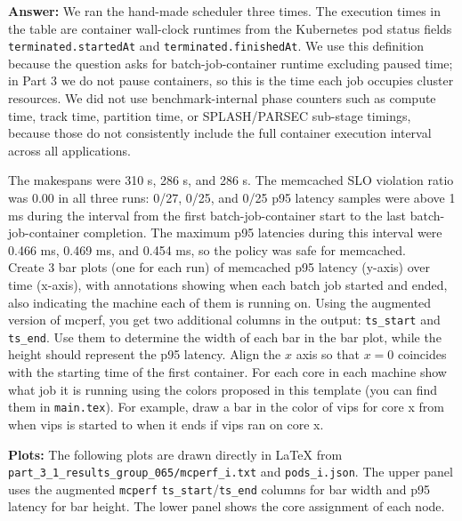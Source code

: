 \begin{enumerate}
\begin{enumerate}
    \textbf{Answer:} We ran the hand-made scheduler three times. The execution times in the table are container wall-clock runtimes from the Kubernetes pod status fields \texttt{terminated.start\allowbreak edAt} and \texttt{terminated.finishedAt}. We use this definition because the question asks for batch-job-container runtime excluding paused time; in Part 3 we do not pause containers, so this is the time each job occupies cluster resources. We did not use benchmark-internal phase counters such as compute time, track time, partition time, or SPLASH/PARSEC sub-stage timings, because those do not consistently include the full container execution interval across all applications.

    The makespans were 310 s, 286 s, and 286 s. The memcached SLO violation ratio was 0.00 in all three runs: 0/27, 0/25, and 0/25 p95 latency samples were above 1 ms during the interval from the first batch-job-container start to the last batch-job-container completion. The maximum p95 latencies during this interval were 0.466 ms, 0.469 ms, and 0.454 ms, so the policy was safe for memcached.
    \\

    Create 3 bar plots (one for each run) of memcached p95 latency (y-axis) over time (x-axis), with annotations showing when each batch job started and ended, also indicating the machine each of them is running on. Using the augmented version of mcperf, you get two additional columns in the output: \texttt{ts\_start} and \texttt{ts\_end}. Use them to determine the width of each bar in the bar plot, while the height should represent the p95 latency. Align the $x$ axis so that $x=0$ coincides with the starting time of the first container.
    For each core in each machine show what job it is running using the colors proposed in this template (you can find them in \texttt{main.tex}). For example, draw a bar in {\color{vips}the color of vips} for core x from when vips is started to when it ends if vips ran on core x.

    \textbf{Plots:} The following plots are drawn directly in \LaTeX{} from \texttt{part\_3\_1\_results\_group\_065\allowbreak /mcperf\_i.txt} and \texttt{pods\_i.json}. The upper panel uses the augmented \texttt{mcperf} \texttt{ts\_start}/\texttt{ts\_end} columns for bar width and p95 latency for bar height. The lower panel shows the core assignment of each node.


\end{enumerate}
\end{enumerate}
